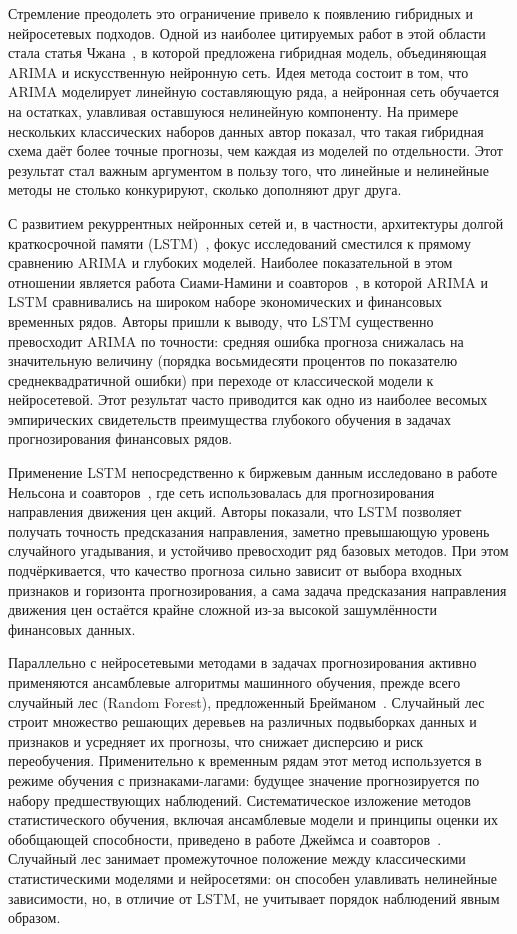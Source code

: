 Стремление преодолеть это ограничение привело к появлению гибридных и нейросетевых подходов. Одной из наиболее цитируемых работ в этой области стала статья Чжана~\cite{zhang2003}, в которой предложена гибридная модель, объединяющая ARIMA и искусственную нейронную сеть. Идея метода состоит в том, что ARIMA моделирует линейную составляющую ряда, а нейронная сеть обучается на остатках, улавливая оставшуюся нелинейную компоненту. На примере нескольких классических наборов данных автор показал, что такая гибридная схема даёт более точные прогнозы, чем каждая из моделей по отдельности. Этот результат стал важным аргументом в пользу того, что линейные и нелинейные методы не столько конкурируют, сколько дополняют друг друга.
 
С развитием рекуррентных нейронных сетей и, в частности, архитектуры долгой краткосрочной памяти (LSTM)~\cite{hochreiter1997}, фокус исследований сместился к прямому сравнению ARIMA и глубоких моделей. Наиболее показательной в этом отношении является работа Сиами-Намини и соавторов~\cite{siami2018}, в которой ARIMA и LSTM сравнивались на широком наборе экономических и финансовых временных рядов. Авторы пришли к выводу, что LSTM существенно превосходит ARIMA по точности: средняя ошибка прогноза снижалась на значительную величину (порядка восьмидесяти процентов по показателю среднеквадратичной ошибки) при переходе от классической модели к нейросетевой. Этот результат часто приводится как одно из наиболее весомых эмпирических свидетельств преимущества глубокого обучения в задачах прогнозирования финансовых рядов.
 
Применение LSTM непосредственно к биржевым данным исследовано в работе Нельсона и соавторов~\cite{nelson2017lstm}, где сеть использовалась для прогнозирования направления движения цен акций. Авторы показали, что LSTM позволяет получать точность предсказания направления, заметно превышающую уровень случайного угадывания, и устойчиво превосходит ряд базовых методов. При этом подчёркивается, что качество прогноза сильно зависит от выбора входных признаков и горизонта прогнозирования, а сама задача предсказания направления движения цен остаётся крайне сложной из-за высокой зашумлённости финансовых данных.
 
Параллельно с нейросетевыми методами в задачах прогнозирования активно применяются ансамблевые алгоритмы машинного обучения, прежде всего случайный лес (Random Forest), предложенный Брейманом~\cite{breiman2001}. Случайный лес строит множество решающих деревьев на различных подвыборках данных и признаков и усредняет их прогнозы, что снижает дисперсию и риск переобучения. Применительно к временным рядам этот метод используется в режиме обучения с признаками-лагами: будущее значение прогнозируется по набору предшествующих наблюдений. Систематическое изложение методов статистического обучения, включая ансамблевые модели и принципы оценки их обобщающей способности, приведено в работе Джеймса и соавторов~\cite{james2021}. Случайный лес занимает промежуточное положение между классическими статистическими моделями и нейросетями: он способен улавливать нелинейные зависимости, но, в отличие от LSTM, не учитывает порядок наблюдений явным образом.
 
